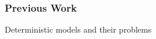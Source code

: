 \begin{frame}
    \frametitle{Previous Work}
    Deterministic models and their problems
\end{frame}